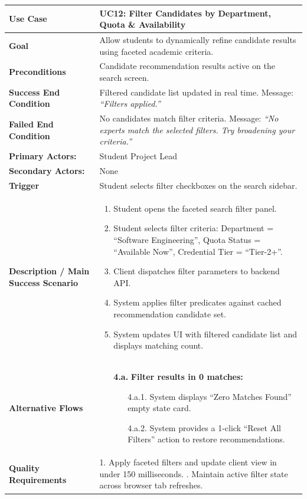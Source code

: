 \begin{table}[H]
\centering
\small
\begin{tabularx}{\textwidth}{|l|X|}
\hline
\rowcolor{lightgray!40} \textbf{Use Case} & \textbf{UC12: Filter Candidates by Department, Quota \& Availability} \\ \hline
\textbf{Goal} & Allow students to dynamically refine candidate results using faceted academic criteria. \\ \hline
\textbf{Preconditions} & Candidate recommendation results active on the search screen. \\ \hline
\textbf{Success End Condition} & Filtered candidate list updated in real time. Message: \textit{``Filters applied.''} \\ \hline
\textbf{Failed End Condition} & No candidates match filter criteria. Message: \textit{``No experts match the selected filters. Try broadening your criteria.''} \\ \hline
\textbf{Primary Actors:} & Student Project Lead \\
\textbf{Secondary Actors:} & None \\ \hline
\textbf{Trigger} & Student selects filter checkboxes on the search sidebar. \\ \hline
\textbf{Description / Main Success Scenario} &
\begin{enumerate}[leftmargin=*]
    \item Student opens the faceted search filter panel.
    \item Student selects filter criteria: Department = ``Software Engineering'', Quota Status = ``Available Now'', Credential Tier = ``Tier-2+''.
    \item Client dispatches filter parameters to backend API.
    \item System applies filter predicates against cached recommendation candidate set.
    \item System updates UI with filtered candidate list and displays matching count.
\end{enumerate} \\ \hline
\textbf{Alternative Flows} &
\begin{itemize}[leftmargin=*]
    \item[\textbf{4.a.}] \textbf{Filter results in 0 matches:}
    \begin{itemize}[leftmargin=*]
        \item[4.a.1.] System displays ``Zero Matches Found'' empty state card.
        \item[4.a.2.] System provides a 1-click ``Reset All Filters'' action to restore recommendations.
    \end{itemize}
\end{itemize} \\ \hline
\textbf{Quality Requirements} & 
1. Apply faceted filters and update client view in under 150 milliseconds. \newline
2. Maintain active filter state across browser tab refreshes. \\ \hline
\end{tabularx}
\end{table}

